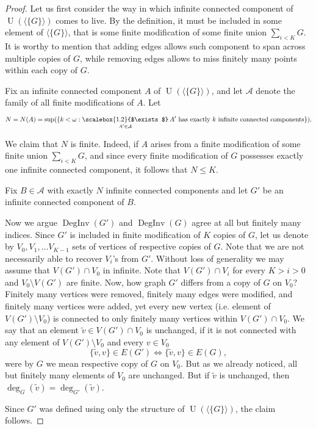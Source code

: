 \documentclass{amsart}
\theoremstyle{plain}
\theoremstyle{definition}
\theoremstyle{remark}
\numberwithin{equation}{section}
\DeclareMathOperator{\ds}{DegInv}
\DeclareMathOperator{\UN}{U}
\begin{document}
\begin{proof}

Let us first consider the way in which infinite connected component of $\UN(\langle \{G\} \rangle)$ comes to live. By the definition, it must be included in some element of $\langle \{G\} \rangle$, that is some finite modification of some finite union $\sum\limits_{i<K} G$. It is worthy to mention that adding edges allows such component to span across multiple copies of $G$, while removing edges allows to miss finitely many points within each copy of $G$.



Fix an infinite connected component $A$ of $\UN(\langle\{G\}\rangle)$, and let $\mathcal{A}$ denote the family of all finite modifications of $A$. Let 
$$N=N(A)=\sup(\{k <\omega : \mathop{\scalebox{1.2}{$\exists$}}\limits_{\substack{A' \in \mathcal A}} 
 A' \text{ has exactly $k$ infinite connected components} \}).$$ 

We claim that \(N\) is finite.  
Indeed, if \(A\) arises from a finite modification of some finite union $\sum\limits_{i<K} G$,  
and since every finite modification of \(G\) possesses exactly one infinite connected component,  
it follows that \(N \leq K\). 



Fix $B \in \mathcal A$ with exactly $N$ infinite connected components and let $G'$ be an infinite connected component of $B$. 

Now we argue $\ds(G')$ and $\ds(G)$ agree at all but finitely many indices. Since $G'$ is included in finite modification of $K$ copies of $G$, let us denote by $V_0, V_1, \ldots V_{K-1}$ sets of vertices of respective copies of $G$. Note that we are not necessarily able to recover $V_i$'s from $G'$. Without loss of generality we may assume that $V(G')\cap V_0$ in infinite. Note that $V(G')\cap V_i$ for every $K>i>0$ and $V_0\setminus V(G')$ are finite. Now, how graph $G'$ differs from a copy of $G$ on $V_0$? Finitely many vertices were removed, finitely many edges were modified, and finitely many vertices were added, yet every new vertex (i.e. element of $V(G')\setminus V_0$) is connected to only finitely many vertices within $V(G')\cap V_0$. We say that an element $\tilde{v}\in V(G')\cap V_0$ is unchanged, if it is not connected with any element of $V(G')\setminus V_0$ and every $v\in V_0$
\[
\{\tilde{v},v\}\in E(G')\Leftrightarrow \{\tilde{v},v\}\in E(G),
\]
were by $G$ we mean respective copy of $G$ on $V_0$. But as we already noticed, all but finitely many elements of $V_0$ are unchanged. But if $\tilde{v}$ is unchanged, then $\deg_G(\tilde{v})=\deg_{G'}(\tilde{v})$.

Since $G'$ was defined using only the structure of  $\UN(\langle \{G\} \rangle)$, the claim follows.


\end{proof}
\end{document}
